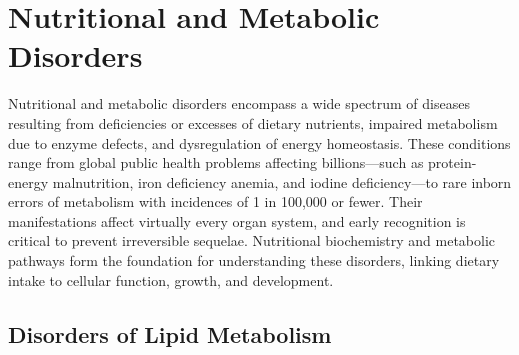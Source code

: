 \chapter{Nutritional and Metabolic Disorders}
\label{ch:nutrition}
Nutritional and metabolic disorders encompass a wide spectrum of diseases resulting from deficiencies or excesses of dietary nutrients, impaired metabolism due to enzyme defects, and dysregulation of energy homeostasis. These conditions range from global public health problems affecting billions---such as protein-energy malnutrition, iron deficiency anemia, and iodine deficiency---to rare inborn errors of metabolism with incidences of 1 in 100,000 or fewer. Their manifestations affect virtually every organ system, and early recognition is critical to prevent irreversible sequelae. Nutritional biochemistry and metabolic pathways form the foundation for understanding these disorders, linking dietary intake to cellular function, growth, and development.

\section{Disorders of Lipid Metabolism}








\label{sec:Disorders of Lipid Metabolism}

